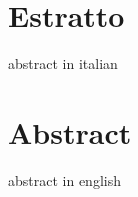 \chapter*{Estratto}
abstract in italian

\cleardoublepage

\chapter*{Abstract}
abstract in english

\cleardoublepage